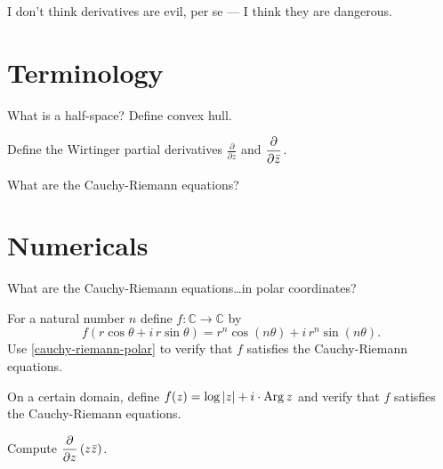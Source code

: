 \documentclass{homework}
\author{Jim Fowler}
\begin{document}
\maketitle

\begin{inspiration}
I don't think derivatives are evil, per se --- I think they are dangerous.
\end{inspiration}

\section{Terminology}

\begin{problem}
  What is a half-space?  Define convex hull.
\end{problem}

\begin{problem}
  Define the Wirtinger partial derivatives $\displaystyle\frac{\partial}{\partial z}$ and $\displaystyle\frac{\partial}{\partial \bar{z}}$.
\end{problem}

\begin{problem}
  What are the Cauchy-Riemann equations?
\end{problem}

\section{Numericals}

\begin{problem}\label{cauchy-riemann-polar}What are the Cauchy-Riemann equations\ldots in polar coordinates?
\end{problem}

\begin{problem}
  For a natural number $n$ define $f : \mathbb{C} \to \mathbb{C}$ by
  \[
    f(r \cos \theta + i \, r\sin \theta) = r^n \cos \left( n \theta \right) + i \, r^n \sin \left( n \theta \right).
  \]
  Use \ref{cauchy-riemann-polar} to verify that $f$ satisfies the
  Cauchy-Riemann equations.
\end{problem}

\begin{problem}
  On a certain domain, define $f(z) = \log \left|z\right| + i \cdot \operatorname{Arg} z$
  and verify that $f$ satisfies the Cauchy-Riemann equations.
\end{problem}

\begin{problem}
  Compute $\displaystyle\frac{\partial}{\partial z} \left( z \bar{z} \right)$.
\end{problem}
\end{document}
